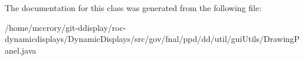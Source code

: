 The documentation for this class was generated from the following file\-:\begin{DoxyCompactItemize}
\item 
/home/mccrory/git-\/ddisplay/roc-\/dynamicdisplays/\-Dynamic\-Displays/src/gov/fnal/ppd/dd/util/gui\-Utils/Drawing\-Panel.\-java\end{DoxyCompactItemize}
